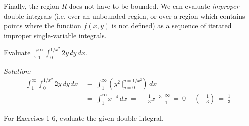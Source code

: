 Finally, the region $R$ does not have to be
bounded. We can evaluate \emph{improper} double integrals (i.e. over an unbounded region, or over a region which
contains points where the function $f(x,y)$ is not defined) as a sequence of iterated improper single-variable
integrals.
\newpage
\begin{exmp}
 Evaluate $\displaystyle\int_1^{\infty} \displaystyle\int_0^{1/{x^2}} 2y \,dy\,dx$.\vspace{1mm}
 \par\noindent \emph{Solution:}
 \begin{align*}
  \int_1^{\infty} \displaystyle\int_0^{1/{x^2}} 2y \,dy\,dx ~&=~
   \int_1^{\infty} \left(y^2 \,\Big|_{y=0}^{y=1/{x^2}} \right) \,dx\\
   &=~ \int_1^{\infty} x^{-4}\,dx 
   ~=~ -\tfrac{1}{3} x^{-3} \,\Big|_{1}^{\infty} ~=~ 0 - (-\tfrac{1}{3}) ~=~ \tfrac{1}{3}
 \end{align*}
\end{exmp}
\startexercises\label{sec3dot2}
\par\noindent For Exercises 1-6, evaluate the given double integral.
